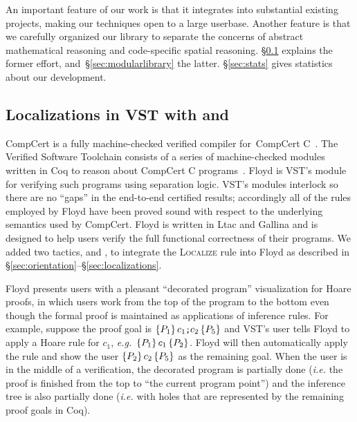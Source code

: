 \label{sec:vst}

An important feature of our work is that it integrates into 
substantial existing projects, making our techniques 
open to a large userbase. Another feature is that we 
carefully organized our library to separate the concerns of 
abstract mathematical reasoning and code-specific spatial reasoning.
\S\ref{sec:vstlocalunlocal} explains the former effort, and~\S\ref{sec:modularlibrary}
the latter. \S\ref{sec:stats} gives statistics about our development.

\subsection{Localizations in VST with  and }
\label{sec:vstlocalunlocal}
\vspace{-0.75ex}
CompCert is a fully machine-checked verified compiler for~CompCert C~\cite{leroy:compcert}.
The Verified Software Toolchain consists of a series of machine-checked modules written in Coq
to reason about CompCert C programs~\cite{appel:programlogics}.
Floyd is VST's module for verifying such programs using separation logic.
VST's modules interlock so there are no ``gaps'' in the end-to-end certified results;
accordingly all of the rules employed by Floyd have been proved sound with respect to
the underlying semantics used by CompCert.  Floyd is written in Ltac and Gallina and is
designed to help users verify the full functional correctness of their programs.
We added two tactics,  and , to
integrate the \textsc{Localize} rule into Floyd as described in \S\ref{sec:orientation}--\S\ref{sec:localizations}.

Floyd presents users with a pleasant ``decorated program'' visualization for Hoare proofs, in which users work from the top of the program to the bottom even though the formal proof is maintained as applications of inference rules.  For example, suppose the proof goal is $\{P_1\}\,c_1{\texttt{\small ;}}c_2\,\{P_5\}$ and VST's user tells Floyd to apply a Hoare rule for $c_1$, \emph{e.g.}~$\{P_1\}\,c_1\,\{P_2\}$.  Floyd will then automatically apply the  rule and show the user $\{P_2\}\,c_2\,\{P_5\}$ as the remaining goal.
When the user is in the middle of a verification, the decorated program is partially done (\emph{i.e.} the proof is finished from the top to ``the current program point'') and the inference tree is also partially done (\emph{i.e.} with holes that are represented by the remaining proof goals in Coq).

